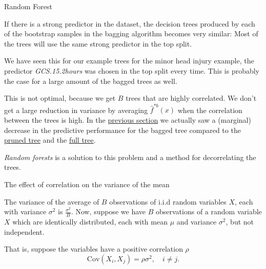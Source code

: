 \documentclass[10pt,ignorenonframetext,]{beamer}
\begin{document}
\begin{frame}{Random Forest}

If there is a strong predictor in the dataset, the decision trees
produced by each of the bootstrap samples in the bagging algorithm
becomes very similar: Most of the trees will use the same strong
predictor in the top split.

We have seen this for our example trees for the minor head injury
example, the predictor \emph{GCS.15.2hours} was chosen in the top split
every time. This is probably the case for a large amount of the bagged
trees as well.

This is not optimal, because we get \(B\) trees that are highly
correlated. We don't get a large reduction in variance by averaging
\(\hat{f}^{*b}(x)\) when the correlation between the trees is high. In
the \href{bagex}{previous section} we actually saw a (marginal) decrease
in the predictive performance for the bagged tree compared to the
\href{expruning}{pruned tree} and the \href{classtree2}{full tree}.

\emph{Random forests} is a solution to this problem and a method for
decorrelating the trees.

\end{frame}

\begin{frame}

\begin{block}{The effect of correlation on the variance of the mean}

The variance of the average of \(B\) observations of i.i.d random
variables \(X\), each with variance \(\sigma^2\) is
\(\frac{\sigma^2}{B}\). Now, suppose we have \(B\) observations of a
random variable \(X\) which are identically distributed, each with mean
\(\mu\) and variance \(\sigma^2\), but not independent.

That is, suppose the variables have a positive correlation \(\rho\)
\[\text{Cov}(X_i, X_j) = \rho \sigma^2, \quad i \neq j.\]

\end{block}

\end{frame}
\end{document}
